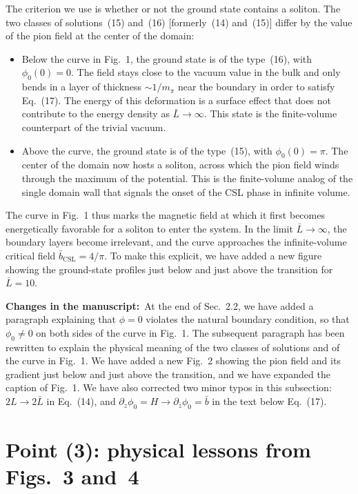\documentclass[11pt,a4paper]{article}
\newcommand{\changes}{\par\smallskip\noindent\textbf{Changes in the manuscript:}\ }
\begin{document}
The criterion we use is whether or not the ground state contains a soliton. The two classes of solutions~(15) and~(16) [formerly~(14) and~(15)] differ by the value of the pion field at the center of the domain:
\begin{itemize}[nosep]
\item Below the curve in Fig.~1, the ground state is of the type~(16), with $\phi_0(0)=0$. The field stays close to the vacuum value in the bulk and only bends in a layer of thickness $\sim1/m_\pi$ near the boundary in order to satisfy Eq.~(17). The energy of this deformation is a surface effect that does not contribute to the energy density as $\bar L\to\infty$. This state is the finite-volume counterpart of the trivial vacuum.
\item Above the curve, the ground state is of the type~(15), with $\phi_0(0)=\pi$. The center of the domain now hosts a soliton, across which the pion field winds through the maximum of the potential. This is the finite-volume analog of the single domain wall that signals the onset of the CSL phase in infinite volume.
\end{itemize}
The curve in Fig.~1 thus marks the magnetic field at which it first becomes energetically favorable for a soliton to enter the system. In the limit $\bar L\to\infty$, the boundary layers become irrelevant, and the curve approaches the infinite-volume critical field $\bar b_\text{CSL}=4/\pi$. To make this explicit, we have added a new figure showing the ground-state profiles just below and just above the transition for $\bar L=10$.

\changes At the end of Sec.~2.2, we have added a paragraph explaining that $\phi=0$ violates the natural boundary condition, so that $\phi_0\neq0$ on both sides of the curve in Fig.~1. The subsequent paragraph has been rewritten to explain the physical meaning of the two classes of solutions and of the curve in Fig.~1. We have added a new Fig.~2 showing the pion field and its gradient just below and just above the transition, and we have expanded the caption of Fig.~1. We have also corrected two minor typos in this subsection: $2L\to2\bar L$ in Eq.~(14), and $\partial_z\phi_0=H\to\partial_{\bar z}\phi_0=\bar b$ in the text below Eq.~(17).

\section*{Point (3): physical lessons from Figs.~3 and~4}
\end{document}
